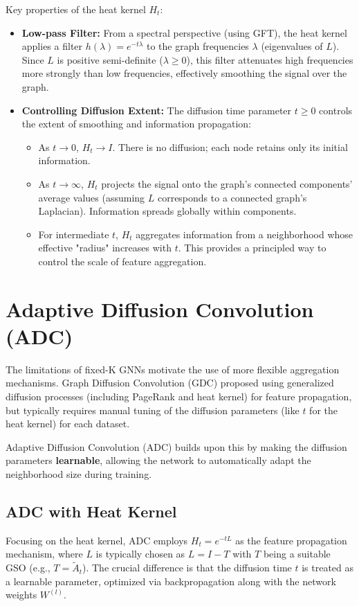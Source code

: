 Key properties of the heat kernel $H_t$:
\begin{itemize}
    \item \textbf{Low-pass Filter:} From a spectral perspective (using GFT), the heat kernel applies a filter $h(\lambda) = e^{-t\lambda}$ to the graph frequencies $\lambda$ (eigenvalues of $L$). Since $L$ is positive semi-definite ($\lambda \ge 0$), this filter attenuates high frequencies more strongly than low frequencies, effectively smoothing the signal over the graph.
    \item \textbf{Controlling Diffusion Extent:} The diffusion time parameter $t \ge 0$ controls the extent of smoothing and information propagation:
        \begin{itemize}
            \item As $t \to 0$, $H_t \to I$. There is no diffusion; each node retains only its initial information.
            \item As $t \to \infty$, $H_t$ projects the signal onto the graph's connected components' average values (assuming $L$ corresponds to a connected graph's Laplacian). Information spreads globally within components.
            \item For intermediate $t$, $H_t$ aggregates information from a neighborhood whose effective "radius" increases with $t$. This provides a principled way to control the scale of feature aggregation.
        \end{itemize}
\end{itemize}

\section{Adaptive Diffusion Convolution (ADC)}
\label{sec:adc}

The limitations of fixed-K GNNs motivate the use of more flexible aggregation mechanisms. Graph Diffusion Convolution (GDC) \cite{Klicpera2019DiffusionGCN} proposed using generalized diffusion processes (including PageRank and heat kernel) for feature propagation, but typically requires manual tuning of the diffusion parameters (like $t$ for the heat kernel) for each dataset.

Adaptive Diffusion Convolution (ADC) \cite{Zhao2021ADC} builds upon this by making the diffusion parameters \textbf{learnable}, allowing the network to automatically adapt the neighborhood size during training.

\subsection{ADC with Heat Kernel}
Focusing on the heat kernel, ADC employs $H_t = e^{-tL}$ as the feature propagation mechanism, where $L$ is typically chosen as $L = I - T$ with $T$ being a suitable GSO (e.g., $T=\tilde{A}_t$). The crucial difference is that the diffusion time $t$ is treated as a learnable parameter, optimized via backpropagation along with the network weights $W^{(l)}$.


